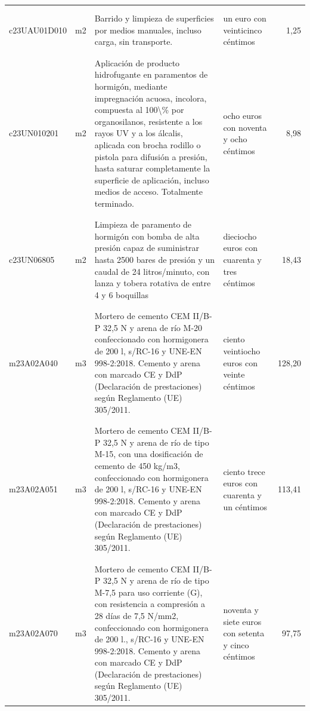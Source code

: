 \begin{supertabular}{|l|l|p{5cm}|p{3cm}|r|}
&&&&\\%
&&&&\\%
c23UAU01D010&m2&Barrido y limpieza de superficies por medios manuales, incluso carga, sin transporte.&un euro con veinticinco céntimos&1,25\\%
&&&&\\%
&&&&\\%
c23UN010201&m2&Aplicación de producto hidrofugante en paramentos de hormigón, mediante impregnación acuosa, incolora, compuesta al 100\textbackslash{}\% por organosilanos, resistente a los rayos UV y a los álcalis, aplicada con brocha rodillo o pistola para difusión a presión, hasta saturar completamente la superficie de aplicación, incluso medios de acceso. Totalmente terminado.&ocho euros con noventa y ocho céntimos&8,98\\%
&&&&\\%
&&&&\\%
c23UN06805&m2&Limpieza de paramento de hormigón con bomba de alta presión capaz de suministrar hasta 2500 bares de presión y un caudal de 24 litros/minuto, con lanza y tobera rotativa de entre 4 y 6 boquillas&dieciocho euros con cuarenta y tres céntimos&18,43\\%
&&&&\\%
&&&&\\%
m23A02A040&m3&Mortero de cemento CEM II/B{-}P 32,5 N y arena de río M{-}20 confeccionado con hormigonera de 200 l, s/RC{-}16 y UNE{-}EN 998{-}2:2018. Cemento y arena con marcado CE y DdP (Declaración de prestaciones) según Reglamento (UE) 305/2011.&ciento veintiocho euros con veinte céntimos&128,20\\%
&&&&\\%
&&&&\\%
m23A02A051&m3&Mortero de cemento CEM II/B{-}P 32,5 N y arena de río de tipo M{-}15, con una dosificación de cemento de 450 kg/m3, confeccionado con hormigonera de 200 l, s/RC{-}16 y UNE{-}EN 998{-}2:2018. Cemento y arena con marcado CE y DdP (Declaración de prestaciones) según Reglamento (UE) 305/2011.&ciento trece euros con cuarenta y un céntimos&113,41\\%
&&&&\\%
&&&&\\%
m23A02A070&m3&Mortero de cemento CEM II/B{-}P 32,5 N y arena de río de tipo M{-}7,5 para uso corriente (G), con resistencia a compresión a 28 días de 7,5 N/mm2, confeccionado con hormigonera de 200 l., s/RC{-}16 y UNE{-}EN 998{-}2:2018. Cemento y arena con marcado CE y DdP (Declaración de prestaciones) según Reglamento (UE) 305/2011.&noventa y siete euros con setenta y cinco céntimos&97,75\\%

\end{supertabular}
